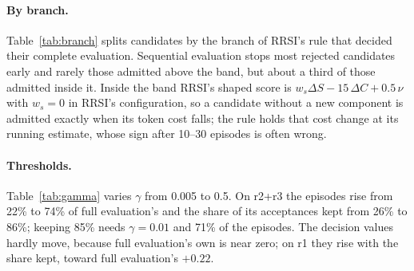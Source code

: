 \documentclass[11pt]{article}
\begin{document}
\paragraph{By branch.} Table~\ref{tab:branch} splits candidates by the branch of RRSI's rule that decided their complete evaluation. Sequential evaluation stops most rejected candidates early and rarely those admitted above the band, but about a third of those admitted inside it. Inside the band RRSI's shaped score is $w_s\Delta S-15\,\Delta C+0.5\,\nu$ with $w_s=0$ in RRSI's configuration, so a candidate without a new component is admitted exactly when its token cost falls; the rule holds that cost change at its running estimate, whose sign after 10--30 episodes is often wrong.

\begin{table}[t]
\centering
\small
\setlength{\tabcolsep}{3pt}
\caption{Share of candidates sequential full evaluation stops (statistical stops; expected over 400 orders for recorded trajectories), by the branch of RRSI's rule that decided the complete evaluation.}
\label{tab:branch}
\end{table}

\paragraph{Thresholds.} Table~\ref{tab:gamma} varies $\gamma$ from 0.005 to 0.5. On r2+r3 the episodes rise from 22\% to 74\% of full evaluation's and the share of its acceptances kept from 26\% to 86\%; keeping 85\% needs $\gamma=0.01$ and 71\% of the episodes. The decision values hardly move, because full evaluation's own is near zero; on r1 they rise with the share kept, toward full evaluation's $+0.22$.
\end{document}
